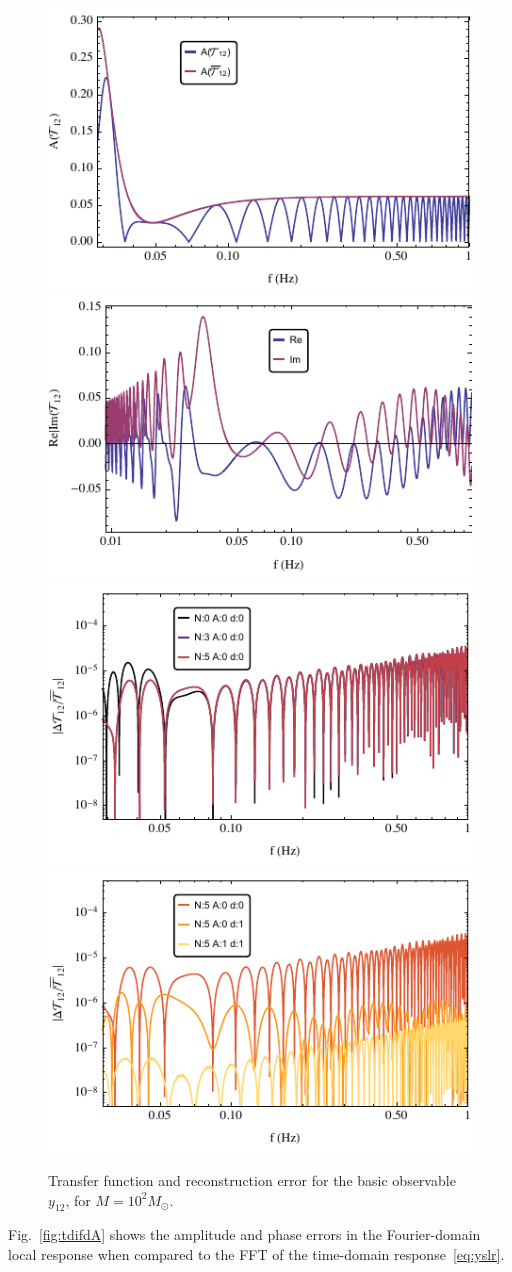 \documentclass[aps,showpacs,%
prd,superscriptaddress,nofootinbib]{revtex4}
\newcommand{\Msol}{M_{\odot}}
\begin{document}
\begin{figure}
  \centering
  \includegraphics[width=.48\linewidth]{plots/LISAtransferM1e2y12Lamp.pdf}
  \hspace{0.2cm}
  \includegraphics[width=.48\linewidth]{plots/LISAtransferM1e2y12LReIm.pdf}
  \includegraphics[width=.48\linewidth]{plots/LISAerrorM1e2y12LcorrPsi.pdf}
  \hspace{0.2cm}
  \includegraphics[width=.48\linewidth]{plots/LISAerrorM1e2y12LcorrAd.pdf}
  \caption{Transfer function and reconstruction error for the basic observable $y_{12}$, for $M=10^{2} \Msol$.}
  \label{fig:prectoymodel}
\end{figure}

Fig.~\ref{fig:tdifdA} shows the amplitude and phase errors in the Fourier-domain local response when compared to the FFT of the time-domain response~\eqref{eq:yslr}.
\end{document}
